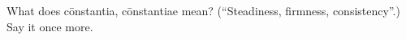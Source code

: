 \begin{tcolorbox}[breakable,colback=teal!4,colframe=teal!35!black,title={Before you move on}]
What does cōnstantia, cōnstantiae mean? (\textquotedblleft{}Steadiness, firmness, consistency\textquotedblright{}.) Say it once more.
\end{tcolorbox}
